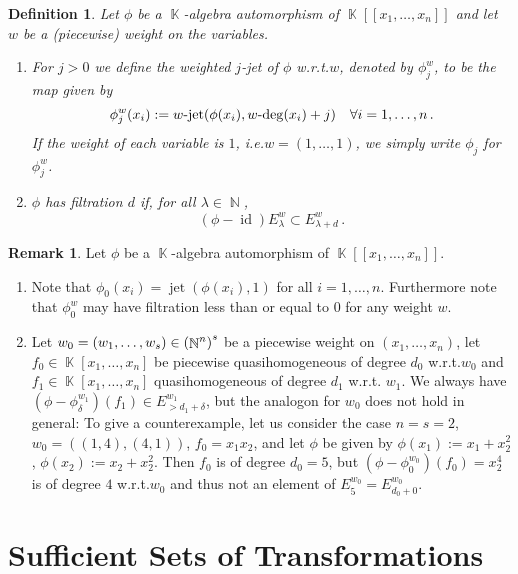 \documentclass[noend]{amsproc}
\newtheorem{defn}[theorem]{Definition}
\theoremstyle{definition}
\newtheorem{remark}[theorem]{Remark}
\let\originalleft\left
\let\originalright\right
\renewcommand{\left}{\mathopen{}\mathclose\bgroup\originalleft}
\renewcommand{\right}{\aftergroup\egroup\originalright}
\DeclareMathOperator{\N}{\mathbb{N}}
\DeclareMathOperator{\K}{\mathbb{K}}
\DeclareMathOperator{\id}{id}
\DeclareMathOperator{\dash}{\!\textnormal{-}\!}
\DeclareMathOperator{\jet}{jet}
\begin{document}
\begin{defn}\label{def:jet_phi}
Let $\phi$ be a $\K$-algebra automorphism of $\K[[x_1,\ldots,x_n]]$ and let
$w$ be a (piecewise) weight on the variables.

\begin{enumerate}
\item
For $j > 0$ we define the weighted $j$-jet of $\phi$ w.r.t.\@ $w$, denoted by
$\phi_j^w$, to be the map given by
\[
\phi_j^w(x_i) := w\dash\jet(\phi(x_i),w\dash\deg(x_i)+j) \quad
\forall i = 1,\ldots,n \,.
\]
If the weight of each variable is $1$, i.e.\@ $w = (1, \ldots, 1)$, we simply
write $\phi_j$ for $\phi_j^w$.

\item\label{enum:filtration}
$\phi$ has filtration $d$ if, for all $\lambda \in \N$,
\[
(\phi-\id)E_\lambda^w \subset E_{\lambda+d}^w \,.
\]
\end{enumerate}
\end{defn}

\begin{remark}\label{rem:weighted_jet}
Let $\phi$ be a $\K$-algebra automorphism of $\K[[x_1,\ldots,x_n]]$.

\begin{enumerate}
\item
Note that $\phi_0(x_i) = \jet(\phi(x_i), 1)$ for all $i = 1, \ldots, n$.
Furthermore note that $\phi_0^w$ may have filtration less than or equal to $0$
for any weight $w$.

\item\label{enum:weighted_jet}
Let $w_0 = (w_1, \ldots, w_s) \in \left(\N^n\right)^s$ be a piecewise weight on
$(x_1, \ldots, x_n)$, let $f_0 \in \K[x_1,\ldots,x_n]$ be piecewise
quasihomogeneous of degree $d_0$ w.r.t.\@ $w_0$ and
$f_1 \in \K[x_1,\ldots,x_n]$ quasihomogeneous of degree $d_1$ w.r.t.\@
$w_1$. We always have
$(\phi-\phi_\delta^{w_1})(f_1) \in E_{>d_1+\delta}^{w_1}$, but the analogon for
$w_0$ does not hold in general: To give a counterexample, let us consider the
case $n = s = 2$, $w_0 = ((1,4), (4,1))$, $f_0 = x_1 x_2$, and let $\phi$ be
given by $\phi(x_1) := x_1+x_2^2$, $\phi(x_2) := x_2+x_2^2$. Then $f_0$ is of
degree $d_0 = 5$, but $(\phi-\phi_0^{w_0})(f_0) = x_2^4$ is of degree $4$
w.r.t.\@ $w_0$ and thus not an element of $E_5^{w_0} = E_{d_0+0}^{w_0}$.
\end{enumerate}
\end{remark}


\section{Sufficient Sets of Transformations}\label{sec:sufficient_sets}
\end{document}

